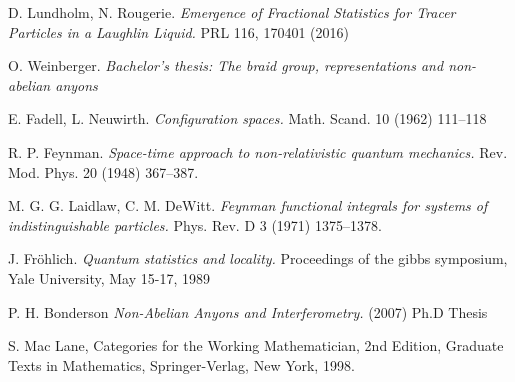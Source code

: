 \documentclass[a4paper,10pt,oneside]{book}
\theoremstyle{plain}
\theoremstyle{definition}
\theoremstyle{remark}
\begin{document}
\begin{thebibliography}{99}
    D. Lundholm, N. Rougerie.
    \textit{Emergence of Fractional Statistics for Tracer Particles in a Laughlin Liquid.}
    PRL 116, 170401 (2016)

    O. Weinberger.
    \textit{Bachelor's thesis: The braid group, representations and non-abelian anyons}

    E. Fadell, L. Neuwirth.
    \textit{Configuration spaces.}
    Math. Scand. 10 (1962) 111–118

    R. P. Feynman.
    \textit{Space-time approach to non-relativistic quantum mechanics.}
    Rev. Mod. Phys. 20 (1948) 367–387.

    M. G. G. Laidlaw, C. M. DeWitt.
    \textit{Feynman functional integrals for systems of indistinguishable particles.}
    Phys. Rev. D 3 (1971) 1375–1378.

    J. Fröhlich.
    \textit{Quantum statistics and locality.}
    Proceedings of the gibbs symposium,
    Yale University, May 15-17, 1989

    P. H. Bonderson
    \textit{Non-Abelian Anyons and Interferometry.}
    (2007) Ph.D Thesis

    S. Mac Lane, Categories for the Working Mathematician, 2nd Edition, Graduate Texts in Mathematics, Springer-Verlag, New York, 1998.

\end{thebibliography}
\end{document}
